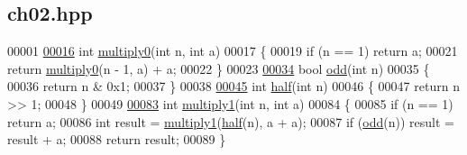 \hypertarget{ch02_8hpp_source}{}\subsection{ch02.\+hpp}

\begin{DoxyCode}
00001 
\mbox{\hyperlink{ch02_8hpp_a7884c00903a67beac160ef1dbac5aadb}{00016}} \textcolor{keywordtype}{int} \mbox{\hyperlink{ch02_8hpp_a7884c00903a67beac160ef1dbac5aadb}{multiply0}}(\textcolor{keywordtype}{int} n, \textcolor{keywordtype}{int} a)
00017 \{
00019   \textcolor{keywordflow}{if} (n == 1) \textcolor{keywordflow}{return} a;
00021   \textcolor{keywordflow}{return} \mbox{\hyperlink{ch02_8hpp_a7884c00903a67beac160ef1dbac5aadb}{multiply0}}(n - 1, a) + a;
00022 \}
00023 
\mbox{\hyperlink{ch02_8hpp_a332ce27d3420d4e8434d6bfc7a7795cd}{00034}} \textcolor{keywordtype}{bool} \mbox{\hyperlink{ch02_8hpp_a332ce27d3420d4e8434d6bfc7a7795cd}{odd}}(\textcolor{keywordtype}{int} n)
00035 \{
00036   \textcolor{keywordflow}{return} n & 0x1;
00037 \}
00038 
\mbox{\hyperlink{ch02_8hpp_a11862a5d46925d507a569ca5a5883168}{00045}} \textcolor{keywordtype}{int} \mbox{\hyperlink{ch02_8hpp_a11862a5d46925d507a569ca5a5883168}{half}}(\textcolor{keywordtype}{int} n)
00046 \{
00047   \textcolor{keywordflow}{return} n >> 1;
00048 \}
00049 
\mbox{\hyperlink{ch02_8hpp_a48a38063c9bdb0bf915285f28e412a7f}{00083}} \textcolor{keywordtype}{int} \mbox{\hyperlink{ch02_8hpp_a48a38063c9bdb0bf915285f28e412a7f}{multiply1}}(\textcolor{keywordtype}{int} n, \textcolor{keywordtype}{int} a)
00084 \{
00085   \textcolor{keywordflow}{if} (n == 1) \textcolor{keywordflow}{return} a;
00086   \textcolor{keywordtype}{int} result = \mbox{\hyperlink{ch02_8hpp_a48a38063c9bdb0bf915285f28e412a7f}{multiply1}}(\mbox{\hyperlink{ch02_8hpp_a11862a5d46925d507a569ca5a5883168}{half}}(n), a + a);
00087   \textcolor{keywordflow}{if} (\mbox{\hyperlink{ch02_8hpp_a332ce27d3420d4e8434d6bfc7a7795cd}{odd}}(n)) result = result + a;
00088   \textcolor{keywordflow}{return} result;
00089 \}
\end{DoxyCode}
